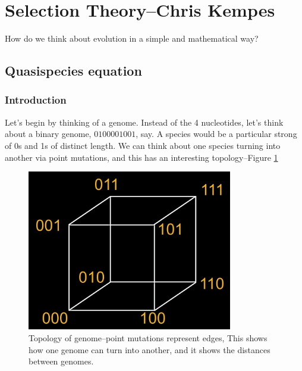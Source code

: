 \documentclass[]{article}
\begin{document}
\section[Selection Theory]{Selection Theory--Chris Kempes}

How do we think about evolution in a simple and mathematical way?

\subsection{Quasispecies equation}

\subsubsection{Introduction}
Let's begin by thinking of a genome. Instead of the 4 nucleotides, let's think about a binary genome, $0100001001$, say. A species would be a particular strong of 0s and 1s of distinct length. We can think about one species turning into another via point mutations, and this has an interesting topology--Figure \ref{fig:GenomeTopology}


\begin{figure}[H]
	\begin{center}
		\caption[Topology of genome]{Topology of genome--point mutations represent edges, This shows how one genome can turn into another, and it shows the distances between genomes.}\label{fig:GenomeTopology} 
		\includegraphics[width=0.8\textwidth]{GenomeTopology}
	\end{center}
\end{figure}
\end{document}
